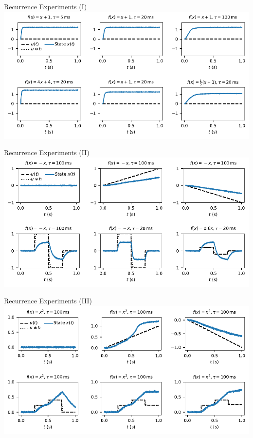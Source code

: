 \documentclass[handout,aspectratio=169]{beamer}
\begin{document}
	\begin{frame}{Recurrence Experiments (I)}
		\centering
		\includegraphics[width=\textwidth]{media/fxp1_example.pdf}
	\end{frame}

	\begin{frame}{Recurrence Experiments (II)}
		\centering
		\includegraphics[width=\textwidth]{media/fmx_example.pdf}
	\end{frame}

	\begin{frame}{Recurrence Experiments (III)}
		\centering
		\includegraphics[width=\textwidth]{media/fxs_example.pdf}
	\end{frame}
\end{document}
